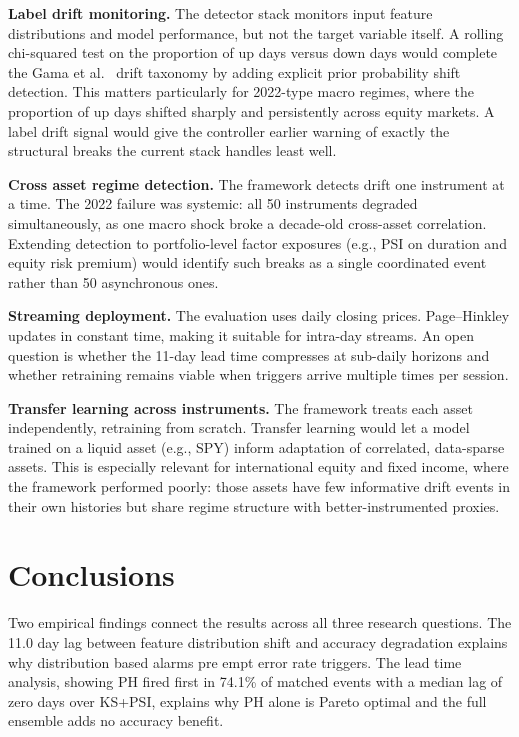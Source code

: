 \textbf{Label drift monitoring.} The detector stack monitors input feature distributions and model performance, but not the target variable itself. A rolling chi-squared test on the proportion of up days versus down days would complete the Gama et al.~\cite{gama2014survey} drift taxonomy by adding explicit prior probability shift detection. This matters particularly for 2022-type macro regimes, where the proportion of up days shifted sharply and persistently across equity markets. A label drift signal would give the controller earlier warning of exactly the structural breaks the current stack handles least well.

\textbf{Cross asset regime detection.} The framework detects drift one instrument at a time. The 2022 failure was systemic: all 50 instruments degraded simultaneously, as one macro shock broke a decade-old cross-asset correlation. Extending detection to portfolio-level factor exposures (e.g., PSI on duration and equity risk premium) would identify such breaks as a single coordinated event rather than 50 asynchronous ones.

\textbf{Streaming deployment.} The evaluation uses daily closing prices. Page--Hinkley updates in constant time, making it suitable for intra-day streams. An open question is whether the 11-day lead time compresses at sub-daily horizons and whether retraining remains viable when triggers arrive multiple times per session.

\textbf{Transfer learning across instruments.} The framework treats each asset independently, retraining from scratch. Transfer learning would let a model trained on a liquid asset (e.g., SPY) inform adaptation of correlated, data-sparse assets. This is especially relevant for international equity and fixed income, where the framework performed poorly: those assets have few informative drift events in their own histories but share regime structure with better-instrumented proxies.

\section{Conclusions}
\label{sec:conclusions4}

Two empirical findings connect the results across all three research questions. The 11.0 day lag between feature distribution shift and accuracy degradation explains why distribution based alarms pre empt error rate triggers. The lead time analysis, showing PH fired first in 74.1\% of matched events with a median lag of zero days over KS+PSI, explains why PH alone is Pareto optimal and the full ensemble adds no accuracy benefit.

